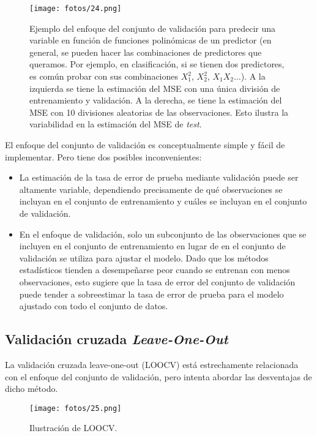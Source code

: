\begin{figure}[h]
\centering
\texttt{[image: fotos/24.png]}
\caption{Ejemplo del enfoque del conjunto de validación para predecir una variable en función de funciones polinómicas de un predictor (en general, se pueden hacer las combinaciones de predictores que queramos. Por ejemplo, en clasificación, si se tienen dos predictores, es común probar con sus combinaciones $X_1^2$, $X_2^2$, $X_1X_2 \dots$). A la izquierda se tiene la estimación del MSE con una única división de entrenamiento y validación. A la derecha, se tiene la estimación del MSE con 10 divisiones aleatorias de las observaciones. Esto ilustra la variabilidad en la estimación del MSE de \textit{test}.}
\label{fig5.2}
\end{figure}

El enfoque del conjunto de validación es conceptualmente simple y fácil de implementar. Pero tiene dos posibles inconvenientes:

\begin{itemize}
\item La estimación de la tasa de error de prueba mediante validación puede ser altamente variable, dependiendo precisamente de qué observaciones se incluyan en el conjunto de entrenamiento y cuáles se incluyan en el conjunto de validación.
\item En el enfoque de validación, solo un subconjunto de las observaciones que se incluyen en el conjunto de entrenamiento en lugar de en el conjunto de validación se utiliza para ajustar el modelo. Dado que los métodos estadísticos tienden a desempeñarse peor cuando se entrenan con menos observaciones, esto sugiere que la tasa de error del conjunto de validación puede tender a sobreestimar la tasa de error de prueba para el modelo ajustado con todo el conjunto de datos.
\end{itemize}

\subsection{Validación cruzada \textit{Leave-One-Out}}

La validación cruzada leave-one-out (LOOCV) está estrechamente relacionada con el enfoque del conjunto de validación, pero intenta abordar las desventajas de dicho método. \\

\begin{figure}[h]
\centering
\texttt{[image: fotos/25.png]}
\caption{Ilustración de LOOCV.}
\label{fig5.3}
\end{figure}

